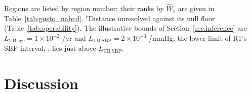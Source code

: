 \documentclass[AMA,Times1COL]{WileyNJDv5}
\begin{document}
\begin{table}[ht]
\centering
\caption{$L^*$ at $\Delta_{\text{clin}} = 1$\%pt with 95\% percentile interval for all 15 partner regions, listed by region number. $L^*$ is the minimum clinical slope (per year for age, per mmHg for SBP) required for the observed distributional difference to produce a treatment effect difference of $1$\%pt on the absolute 30-day mortality scale.\label{tab:gusto_lstar_joint}}
\begin{tablenotes}
\item Regions are listed by region number; their ranks by $\widehat{W}_1$ are given in Table~\ref{tab:gusto_nabcd}. $^\dagger$Distance unresolved against its null floor (Table~\ref{tab:operability}). The illustrative bounds of Section~\ref{sec:inference} are $L_{\text{UB,age}} = 1\times10^{-2}$ /yr and $L_{\text{UB,SBP}} = 2\times10^{-3}$ /mmHg; the lower limit of R1's SBP interval, , lies just above $L_{\text{UB,SBP}}$.
\end{tablenotes}
\end{table}

\section{Discussion}\label{sec:discussion}
\end{document}
